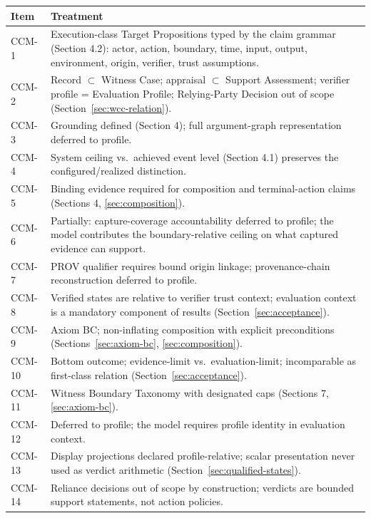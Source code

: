 \documentclass[11pt]{article}
\begin{document}
\begin{center}
\footnotesize
\begin{tabular}{@{}lp{10.2cm}@{}}
\toprule
Item & Treatment \\
\midrule
CCM-1 & Execution-class Target Propositions typed by the claim grammar (Section 4.2): actor, action, boundary, time, input, output, environment, origin, verifier, trust assumptions. \\
CCM-2 & Record $\subset$ Witness Case; appraisal $\subset$ Support Assessment; verifier profile = Evaluation Profile; Relying-Party Decision out of scope (Section~\ref{sec:wcc-relation}). \\
CCM-3 & Grounding defined (Section 4); full argument-graph representation deferred to profile. \\
CCM-4 & System ceiling vs.\ achieved event level (Section 4.1) preserves the configured/realized distinction. \\
CCM-5 & Binding evidence required for composition and terminal-action claims (Sections 4, \ref{sec:composition}). \\
CCM-6 & Partially: capture-coverage accountability deferred to profile; the model contributes the boundary-relative ceiling on what captured evidence can support. \\
CCM-7 & PROV qualifier requires bound origin linkage; provenance-chain reconstruction deferred to profile. \\
CCM-8 & Verified states are relative to verifier trust context; evaluation context is a mandatory component of results (Section~\ref{sec:acceptance}). \\
CCM-9 & Axiom BC; non-inflating composition with explicit preconditions (Sections~\ref{sec:axiom-bc}, \ref{sec:composition}). \\
CCM-10 & Bottom outcome; evidence-limit vs.\ evaluation-limit; incomparable as first-class relation (Section~\ref{sec:acceptance}). \\
CCM-11 & Witness Boundary Taxonomy with designated caps (Sections 7, \ref{sec:axiom-bc}). \\
CCM-12 & Deferred to profile; the model requires profile identity in evaluation context. \\
CCM-13 & Display projections declared profile-relative; scalar presentation never used as verdict arithmetic (Section~\ref{sec:qualified-states}). \\
CCM-14 & Reliance decisions out of scope by construction; verdicts are bounded support statements, not action policies. \\

\end{tabular}
\end{center}
\end{document}
